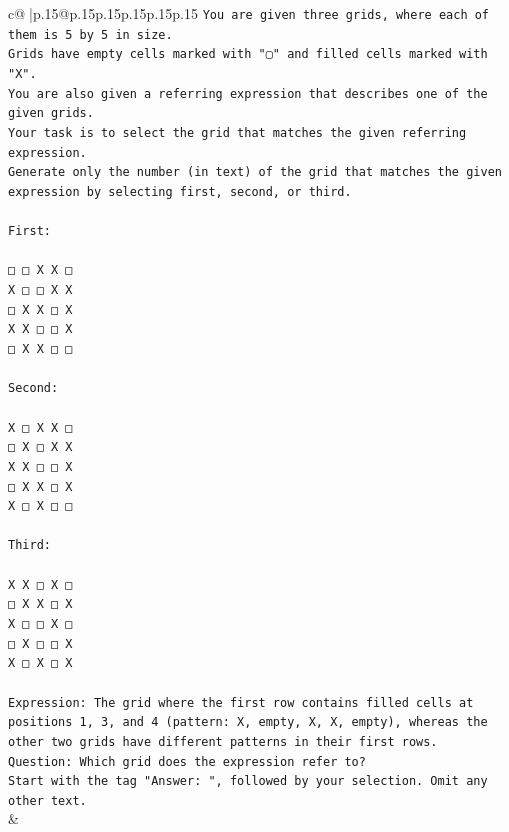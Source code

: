 \documentclass{article}
\begin{document}
{\begin{supertabular}{c@{$\;$}|p{.15\linewidth}@{}p{.15\linewidth}p{.15\linewidth}p{.15\linewidth}p{.15\linewidth}p{.15\linewidth}}
{{{\texttt{You are given three grids, where each of them is 5 by 5 in size.} \\
\texttt{Grids have empty cells marked with "▢" and filled cells marked with "X".} \\
\texttt{You are also given a referring expression that describes one of the given grids.} \\
\texttt{Your task is to select the grid that matches the given referring expression.} \\
\texttt{Generate only the number (in text) of the grid that matches the given expression by selecting first, second, or third.} \\
\\ 
\texttt{First:} \\
\\ 
\texttt{□ □ X X □} \\
\texttt{X □ □ X X} \\
\texttt{□ X X □ X} \\
\texttt{X X □ □ X} \\
\texttt{□ X X □ □} \\
\\ 
\texttt{Second:} \\
\\ 
\texttt{X □ X X □} \\
\texttt{□ X □ X X} \\
\texttt{X X □ □ X} \\
\texttt{□ X X □ X} \\
\texttt{X □ X □ □} \\
\\ 
\texttt{Third:} \\
\\ 
\texttt{X X □ X □} \\
\texttt{□ X X □ X} \\
\texttt{X □ □ X □} \\
\texttt{□ X □ □ X} \\
\texttt{X □ X □ X} \\
\\ 
\texttt{Expression: The grid where the first row contains filled cells at positions 1, 3, and 4 (pattern: X, empty, X, X, empty), whereas the other two grids have different patterns in their first rows.} \\
\texttt{Question: Which grid does the expression refer to?} \\
\texttt{Start with the tag "Answer: ", followed by your selection. Omit any other text.} \\
            }
        }
    }
    & \\ \\


\end{supertabular}}
\end{document}
